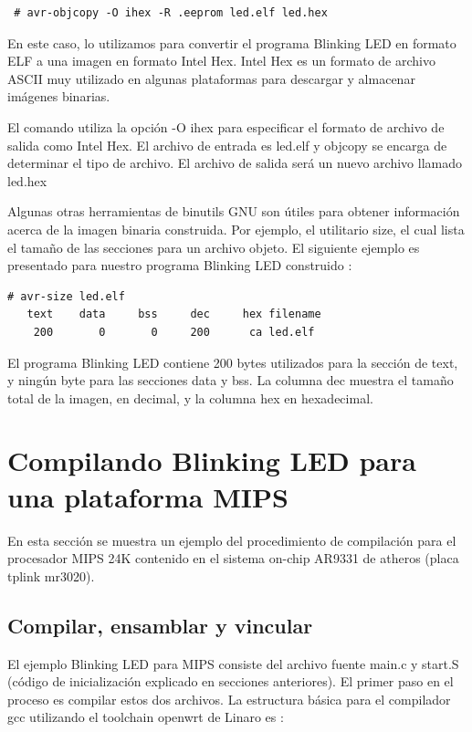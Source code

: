 \documentclass[output=paper, 
colorlinks,
citecolor=brown,
newtxmath
]{langscibook}
\begin{document}
\begin{verbatim}
 # avr-objcopy -O ihex -R .eeprom led.elf led.hex
\end{verbatim}

En este caso, lo utilizamos para convertir el programa Blinking LED 
en formato ELF a una imagen en formato Intel Hex. Intel Hex 
es un formato de archivo ASCII muy utilizado en algunas plataformas
para descargar y almacenar imágenes binarias.

El comando utiliza la opción -O ihex para especificar el formato 
de archivo de salida como Intel Hex. El archivo de entrada es led.elf
y objcopy se encarga de determinar el tipo de archivo. El archivo de salida
será un nuevo archivo llamado led.hex

Algunas otras herramientas de binutils GNU son útiles para obtener 
información acerca de la imagen binaria construida.
Por ejemplo, el utilitario size, el cual lista el tamaño de las secciones
para un archivo objeto. El siguiente ejemplo es presentado
para nuestro programa Blinking LED construido :

\begin{verbatim}
# avr-size led.elf
   text	   data	    bss	    dec	    hex	filename
    200	      0	      0	    200	     ca	led.elf
\end{verbatim}

El programa Blinking LED contiene 200 bytes utilizados para la sección de text, y
ningún byte para las secciones data y bss. La columna dec muestra el tamaño
total de la imagen, en decimal, y la columna hex en hexadecimal.


\section {Compilando Blinking LED para una plataforma MIPS}

En esta sección se muestra un ejemplo del procedimiento de compilación 
para el procesador MIPS 24K contenido en el sistema on-chip AR9331 de atheros
(placa tplink mr3020).

\subsection {Compilar, ensamblar y vincular}

El ejemplo Blinking LED para MIPS consiste del archivo fuente main.c y start.S
(código de inicialización explicado en secciones anteriores).
El primer paso en el proceso es compilar estos dos archivos.
La estructura básica para el compilador gcc utilizando el toolchain openwrt
de Linaro es :
\end{document}
